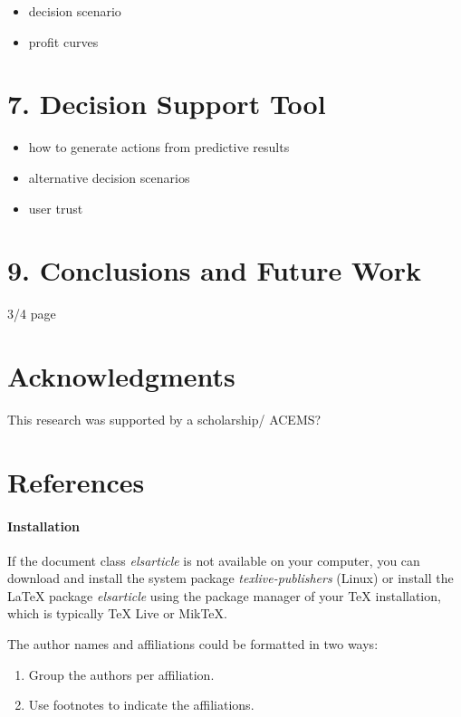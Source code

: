 \documentclass[]{elsarticle} %
\begin{document}
\begin{itemize}
\item
  decision scenario
\item
  profit curves
\end{itemize}

\section{7. Decision Support Tool}\label{decision-support-tool}

\begin{itemize}
\item
  how to generate actions from predictive results
\item
  alternative decision scenarios
\item
  user trust
\end{itemize}

\section{9. Conclusions and Future
Work}\label{conclusions-and-future-work}

3/4 page

\section{Acknowledgments}\label{acknowledgments}

This research was supported by a scholarship/ ACEMS?

\section*{References}\label{references}

\paragraph{Installation}\label{installation}

If the document class \emph{elsarticle} is not available on your
computer, you can download and install the system package
\emph{texlive-publishers} (Linux) or install the LaTeX package
\emph{elsarticle} using the package manager of your TeX installation,
which is typically TeX Live or MikTeX.

The author names and affiliations could be formatted in two ways:

\begin{enumerate}
\def\labelenumi{(\arabic{enumi})}
\item
  Group the authors per affiliation.
\item
  Use footnotes to indicate the affiliations.
\end{enumerate}
\end{document}
